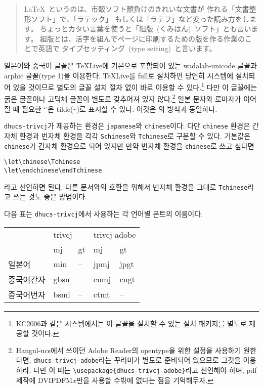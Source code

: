 
\begin{quote}
\begin{japanese}
\LaTeX~というのは、市販ソフト顏負けのきれいな文書が
作れる「文書整形ソフト」で、「ラテック」
もしくは「ラテフ」など変った読み方をします。
ちょっとカタい言葉を使うと「組版~(くみはん)~ソフト」とも言います。
組版とは、活字を組んでページに印刷するための版を作る作業のことで英語で
タイプセッティング~(type setting)~と言います。
\end{japanese}
\end{quote}

일본어와 중국어 글꼴은 \TeX{}Live에 기본으로 포함되어 있는
wadalab-unicode 글꼴과 arphic 글꼴(type 1)을 이용한다. 
\TeX{}Live를 full로 설치하면 당연히 시스템에 설치되어 있을 것이므로
별도의 글꼴 설치 절차 없이 바로 이용할 수 있다.\footnote{%
  KC2006과 같은 시스템에서는 이 글꼴을 설치할 수 있는
  설치 패키지를 별도로 제공할 것이다.}
다만 이 글꼴에는
굵은 글꼴이나 고딕체 글꼴이 별도로 갖추어져 있지 않다.\footnote{%
  Hangul-ucs에서 쓰이던 Adobe Reader의 opentype을
  위한 설정을 사용하기 원한다면, \texttt{dhucs-trivcj-adobe}라는
  꾸러미가 별도로 준비되어 있으므로 그것을 이용하라. 다만 이 때는
  \texttt{\textbackslash usepackage}\texttt{\{dhucs-trivcj-adobe\}}라고
  선언해야 하며, pdf 제작에 DVIPDFM$x$만을 사용할 수밖에 없다는
  점을 기억해두자.}
일본 문자와 로마자가 이어질 때 필요한 `'은 tilde(\verb|~|)로 표시할 수 있다.
이것은 의 방식과 동일하다.

\texttt{dhucs-trivcj}가 제공하는 환경은 \texttt{japanese}와
\texttt{chinese}이다. 다만 \texttt{chinese} 환경은 간자체 환경과
번자체 환경을 각각 \texttt{Schinese}와 \texttt{Tchinese}로
구분할 수 있다. 기본값은 \texttt{chinese}가 간자체 환경으로
되어 있지만 만약 번자체 환경을 \texttt{chinese}로 쓰고 싶다면
\begin{verbatim}
\let\chinese\Tchinese
\let\endchinese\endTchinese
\end{verbatim}
라고 선언하면 된다. 다른 문서와의 호환을 위해서 번자체 환경을
그대로 \texttt{Tchinese}라고 쓰는 것도 좋은 방법이다.

다음 표는 \texttt{dhucs-trivcj}에서 사용하는 각 언어별
폰트의 이름이다. 
\begin{center}
\begin{tabular}{l|ll|ll}
\hline
 & \multicolumn{2}{l|}{trivcj} & \multicolumn{2}{l}{trivcj-adobe} \\
\cline{2-5}
 & mj & gt & mj & gt \\
\hline
일본어 & min & -- & jpmj & jpgt \\
중국어간자 & gbsn & -- & cnmj & cngt \\
중국어번자 & bsmi & -- & ctmt & -- \\
\hline
\end{tabular}
\end{center}

